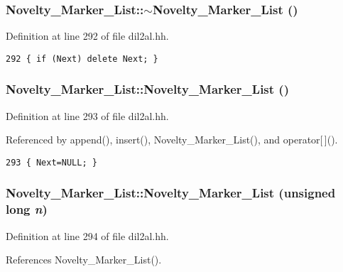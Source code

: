 \subsubsection{\setlength{\rightskip}{0pt plus 5cm}Novelty\_\-Marker\_\-List::$\sim$Novelty\_\-Marker\_\-List ()\hspace{0.3cm}{\tt  [inline]}}\label{classNovelty__Marker__List_a0}




Definition at line 292 of file dil2al.hh.



\footnotesize\begin{verbatim}292 { if (Next) delete Next; }
\end{verbatim}\normalsize 
{}
\subsubsection{\setlength{\rightskip}{0pt plus 5cm}Novelty\_\-Marker\_\-List::Novelty\_\-Marker\_\-List ()\hspace{0.3cm}{\tt  [inline]}}\label{classNovelty__Marker__List_a1}




Definition at line 293 of file dil2al.hh.

Referenced by append(), insert(), Novelty\_\-Marker\_\-List(), and operator[$\,$]().



\footnotesize\begin{verbatim}293 { Next=NULL; }
\end{verbatim}\normalsize 
{}
\subsubsection{\setlength{\rightskip}{0pt plus 5cm}Novelty\_\-Marker\_\-List::Novelty\_\-Marker\_\-List (unsigned long {\em n})\hspace{0.3cm}{\tt  [inline]}}\label{classNovelty__Marker__List_a2}




Definition at line 294 of file dil2al.hh.

References Novelty\_\-Marker\_\-List().



